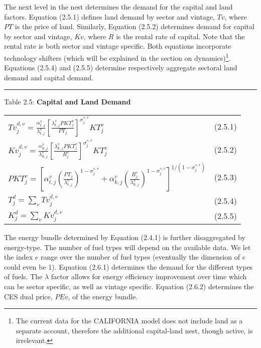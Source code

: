 \documentclass[12pt]{article}
\begin{document}
The next level in the nest determines the demand for the capital and land factors. Equation (2.5.1) defines land demand by sector and vintage, $Tv$, where $PT$ is the price of land. Similarly, Equation (2.5.2) determines demand for capital by sector and vintage, $Kv$, where $R$ is the rental rate of capital. Note that the rental rate is both sector and vintage specific. Both equations incorporate technology shifters (which will be explained in the section on dynamics)\footnote{The current data for the CALIFORNIA model does not include land as a separate account, therefore the additional capital-land nest, though active, is irrelevant.}.  Equations (2.5.4) and (2.5.5) determine respectively aggregate sectoral land demand and capital demand.


\noindent\rule{\linewidth}{0.4pt}
\begin{center}
\begin{large}

{\centering Table 2.5: \textbf{Capital and Land Demand
} \par}

\begin{tabular}{>{\raggedright}p{} l}

$Tv^{d,v}_j = \frac {\alpha^v_{t,j}} {\lambda^v_{t,j}} \left   [\frac {\lambda^v_{t,j}PKT^v_j} {PT_j} \right]^{\sigma^{s,v}_j} KT^v_j$ & (2.5.1) \\

$Kv^{d,v}_j = \frac {\alpha^v_{k,j}} {\lambda^v_{k,j}} \left   [\frac {\lambda^v_{k,j}PKT^v_j} {R^v_j} \right]^{\sigma^{s,v}_j} KT^v_j$ & (2.5.2)\\[15pt]

$PKT^v_j = \left[\alpha^v_{t,j} \left(\frac{PT_j}{\lambda^v_{t,j}} \right)^{1-\sigma^{s,v}_j} + \alpha^v_{k,j} \left(\frac{R^v_j}{\lambda^v_{k,j}}\right)^{1-\sigma^{s,v}_j} \right]^{1/({1-\sigma^{s,v}_j})}$ & (2.5.3) \\[10pt]

$T^d_j = \displaystyle \sum_v Tv^{d,v}_j$ & (2.5.4) \\[10pt]

$K^d_j = \displaystyle \sum_v Kv^{d,v}_j$ & (2.5.5) \\[10pt]

\hline
\end{tabular}
\end{large}
\end{center}

The energy bundle determined by Equation (2.4.1) is further disaggregated by energy-type. The number of fuel types will depend on the available data. We let the index $e$ range over the number of fuel types (eventually the dimension of $e$ could even be 1). Equation (2.6.1) determines the demand for the different types of fuels. The $\lambda$ factor allows for energy efficiency improvement over time which can be sector specific, as well as vintage specific. Equation (2.6.2) determines the CES dual price, $PEv$, of the energy bundle.
\end{document}
